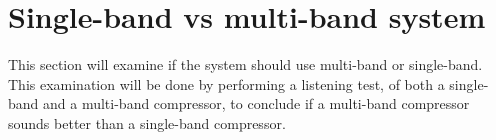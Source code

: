 \section{Single-band vs multi-band system}
This section will examine if the system should use multi-band or single-band. This examination will be done by performing a listening test, of both a single-band and a multi-band compressor, to conclude if a multi-band compressor sounds better than a single-band compressor. 

